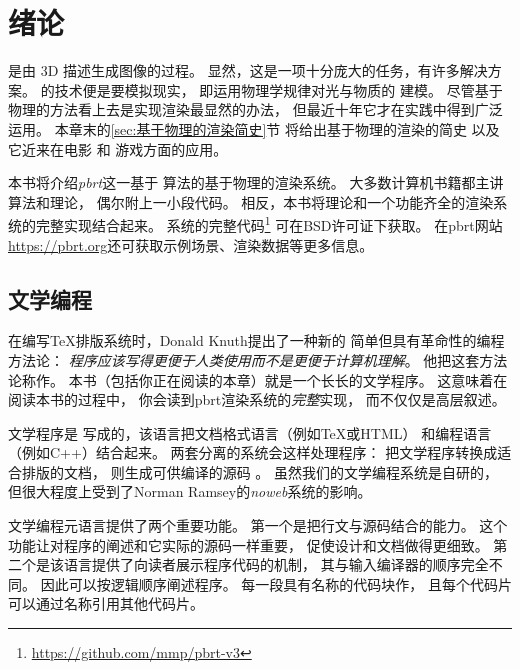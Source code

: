 
\chapter{绪论}\label{chap:绪论}

是由
3D
描述生成图像的过程。
显然，这是一项十分庞大的任务，有许多解决方案。
的技术便是要模拟现实，
即运用物理学规律对光与物质的
建模。
尽管基于物理的方法看上去是实现渲染最显然的办法，
但最近十年它才在实践中得到广泛运用。
本章末的\ref{sec:基于物理的渲染简史}节
将给出基于物理的渲染的简史
以及它近来在电影
和
游戏方面的应用。

本书将介绍\emph{pbrt}这一基于
算法的基于物理的渲染系统。
大多数计算机书籍都主讲算法和理论，
偶尔附上一小段代码。
相反，本书将理论和一个功能齐全的渲染系统的完整实现结合起来。
系统的完整代码\footnote{\url{https://github.com/mmp/pbrt-v3}}
可在BSD许可证下获取。
在pbrt网站\url{https://pbrt.org}还可获取示例场景、渲染数据等更多信息。


\section{文学编程}\label{sec:文学编程}

在编写\TeX 排版系统时，Donald Knuth提出了一种新的
简单但具有革命性的编程方法论：
\emph{程序应该写得更便于人类使用而不是更便于计算机理解}。
他把这套方法论称作。
本书（包括你正在阅读的本章）就是一个长长的文学程序。
这意味着在阅读本书的过程中，
你会读到pbrt渲染系统的\emph{完整}实现，
而不仅仅是高层叙述。

文学程序是
写成的，该语言把文档格式语言（例如\TeX 或HTML）
和编程语言（例如C++）结合起来。
两套分离的系统会这样处理程序：
把文学程序转换成适合排版的文档，
则生成可供编译的源码
。
虽然我们的文学编程系统是自研的，
但很大程度上受到了Norman Ramsey的\emph{noweb}系统的影响。

文学编程元语言提供了两个重要功能。
第一个是把行文与源码结合的能力。
这个功能让对程序的阐述和它实际的源码一样重要，
促使设计和文档做得更细致。
第二个是该语言提供了向读者展示程序代码的机制，
其与输入编译器的顺序完全不同。
因此可以按逻辑顺序阐述程序。
每一段具有名称的代码块作，
且每个代码片可以通过名称引用其他代码片。

